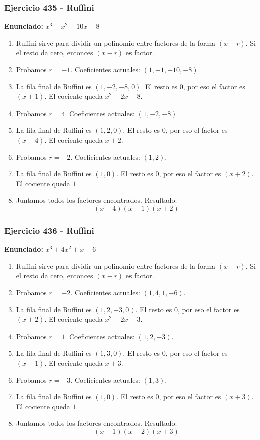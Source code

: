 \documentclass[11pt,a4paper]{article}
\begin{document}
\vspace{0.2cm}
\subsubsection*{Ejercicio 435 - Ruffini}
\textbf{Enunciado:} $ x^{3} - x^{2} - 10 x - 8 $\par
\begin{enumerate}[leftmargin=2em]
\item Ruffini sirve para dividir un polinomio entre factores de la forma \((x-r)\). Si el resto da cero, entonces \((x-r)\) es factor.
\item Probamos \(r=-1\). Coeficientes actuales: \((1, -1, -10, -8)\).
\item La fila final de Ruffini es \((1, -2, -8, 0)\). El resto es \(0\), por eso el factor es \((x+1)\). El cociente queda \(x^{2} - 2 x - 8\).
\item Probamos \(r=4\). Coeficientes actuales: \((1, -2, -8)\).
\item La fila final de Ruffini es \((1, 2, 0)\). El resto es \(0\), por eso el factor es \((x-4)\). El cociente queda \(x + 2\).
\item Probamos \(r=-2\). Coeficientes actuales: \((1, 2)\).
\item La fila final de Ruffini es \((1, 0)\). El resto es \(0\), por eso el factor es \((x+2)\). El cociente queda \(1\).
\item Juntamos todos los factores encontrados. Resultado: \[\boxed{\left(x - 4\right) \left(x + 1\right) \left(x + 2\right)}\]
\end{enumerate}

\vspace{0.2cm}
\subsubsection*{Ejercicio 436 - Ruffini}
\textbf{Enunciado:} $ x^{3} + 4 x^{2} + x - 6 $\par
\begin{enumerate}[leftmargin=2em]
\item Ruffini sirve para dividir un polinomio entre factores de la forma \((x-r)\). Si el resto da cero, entonces \((x-r)\) es factor.
\item Probamos \(r=-2\). Coeficientes actuales: \((1, 4, 1, -6)\).
\item La fila final de Ruffini es \((1, 2, -3, 0)\). El resto es \(0\), por eso el factor es \((x+2)\). El cociente queda \(x^{2} + 2 x - 3\).
\item Probamos \(r=1\). Coeficientes actuales: \((1, 2, -3)\).
\item La fila final de Ruffini es \((1, 3, 0)\). El resto es \(0\), por eso el factor es \((x-1)\). El cociente queda \(x + 3\).
\item Probamos \(r=-3\). Coeficientes actuales: \((1, 3)\).
\item La fila final de Ruffini es \((1, 0)\). El resto es \(0\), por eso el factor es \((x+3)\). El cociente queda \(1\).
\item Juntamos todos los factores encontrados. Resultado: \[\boxed{\left(x - 1\right) \left(x + 2\right) \left(x + 3\right)}\]
\end{enumerate}
\end{document}
